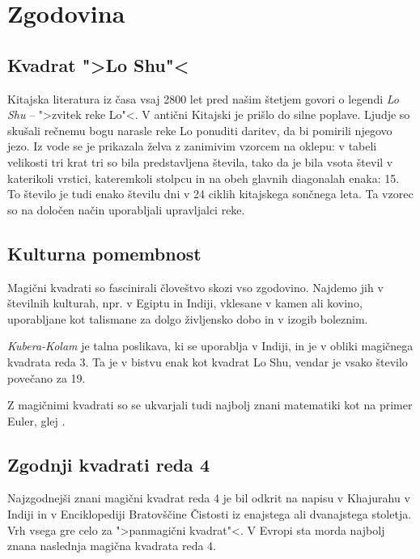 \documentclass[a4paper,12pt]{article}
\theoremstyle{definition}
\theoremstyle{plain}
\begin{document}

\section{Zgodovina}

\subsection{Kvadrat ">Lo Shu"<}

Kitajska literatura iz časa vsaj 2800 let pred našim štetjem govori o legendi
\emph{Lo Shu} -- ">zvitek reke Lo"<. V antični Kitajski je prišlo do
silne poplave. Ljudje so skušali rečnemu bogu narasle reke Lo ponuditi daritev,
da bi pomirili njegovo jezo. Iz vode se je prikazala želva z zanimivim vzorcem
na oklepu: v tabeli velikosti tri krat tri so bila predstavljena števila, tako
da je bila vsota števil v katerikoli vrstici, kateremkoli stolpcu in na obeh
glavnih diagonalah enaka: 15. To število je tudi enako številu dni v 24 ciklih
kitajskega sončnega leta. Ta vzorec so na določen način uporabljali upravljalci
reke.


\subsection{Kulturna pomembnost}

Magični kvadrati so fascinirali človeštvo skozi vso zgodovino. Najdemo jih
v številnih kulturah, npr. v Egiptu in Indiji, vklesane v kamen ali
kovino, uporabljane kot talismane za dolgo življensko dobo in v
izogib boleznim.

\emph{Kubera-Kolam} je talna poslikava, ki se uporablja v Indiji, in je v
obliki magičnega kvadrata reda 3. Ta je v bistvu enak kot kvadrat
Lo Shu, vendar je vsako število povečano za 19.

Z magičnimi kvadrati so se ukvarjali tudi najbolj znani matematiki kot na
primer Euler, glej \cite{euler}. 


\subsection{Zgodnji kvadrati reda 4}

Najzgodnejši znani magični kvadrat reda 4 je bil odkrit na napisu
v Khajurahu v Indiji in v Enciklopediji Bratovščine Čistosti iz enajstega
ali dvanajstega stoletja. Vrh vsega gre celo za ">panmagični kvadrat"<.
V Evropi sta morda najbolj znana naslednja magična kvadrata reda 4.
\end{document}
